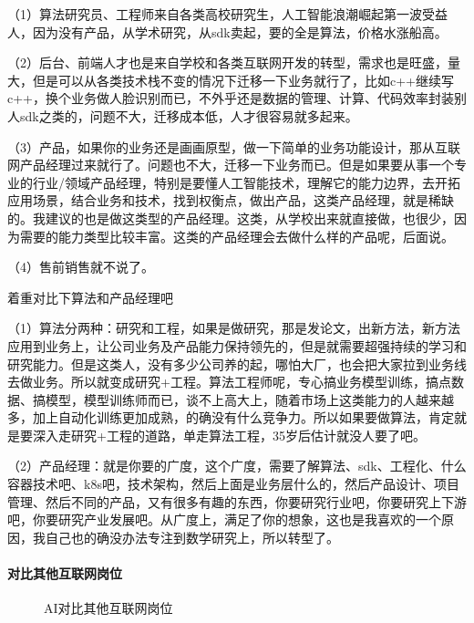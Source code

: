 \documentclass[letterpaper,11pt,english]{sphinxmanual}
\begin{document}
（1）算法研究员、工程师来自各类高校研究生，人工智能浪潮崛起第一波受益人，因为没有产品，从学术研究，从sdk卖起，要的全是算法，价格水涨船高。

（2）后台、前端人才也是来自学校和各类互联网开发的转型，需求也是旺盛，量大，但是可以从各类技术栈不变的情况下迁移一下业务就行了，比如c++继续写c++，换个业务做人脸识别而已，不外乎还是数据的管理、计算、代码效率封装别人sdk之类的，问题不大，迁移成本低，人才很容易就多起来。

（3）产品，如果你的业务还是画画原型，做一下简单的业务功能设计，那从互联网产品经理过来就行了。问题也不大，迁移一下业务而已。但是如果要从事一个专业的行业/领域产品经理，特别是要懂人工智能技术，理解它的能力边界，去开拓应用场景，结合业务和技术，找到权衡点，做出产品，这类产品经理，就是稀缺的。我建议的也是做这类型的产品经理。这类，从学校出来就直接做，也很少，因为需要的能力类型比较丰富。这类的产品经理会去做什么样的产品呢，后面说。

（4）售前销售就不说了。

着重对比下算法和产品经理吧

（1）算法分两种：研究和工程，如果是做研究，那是发论文，出新方法，新方法应用到业务上，让公司业务及产品能力保持领先的，但是就需要超强持续的学习和研究能力。但是这类人，没有多少公司养的起，哪怕大厂，也会把大家拉到业务线去做业务。所以就变成研究+工程。算法工程师呢，专心搞业务模型训练，搞点数据、搞模型，模型训练师而已，谈不上高大上，随着市场上这类能力的人越来越多，加上自动化训练更加成熟，的确没有什么竞争力。所以如果要做算法，肯定就是要深入走研究+工程的道路，单走算法工程，35岁后估计就没人要了吧。

（2）产品经理：就是你要的广度，这个广度，需要了解算法、sdk、工程化、什么容器技术吧、k8s吧，技术架构，然后上面是业务层什么的，然后产品设计、项目管理、然后不同的产品，又有很多有趣的东西，你要研究行业吧，你要研究上下游吧，你要研究产业发展吧。从广度上，满足了你的想象，这也是我喜欢的一个原因，我自己也的确没办法专注到数学研究上，所以转型了。


\paragraph{对比其他互联网岗位}
\label{\detokenize{chapter_project/AI_talents:id7}}
\begin{figure}[H]
\centering
\capstart

\noindent{}
\caption{AI对比其他互联网岗位}\label{\detokenize{chapter_project/AI_talents:id20}}\end{figure}
\end{document}
